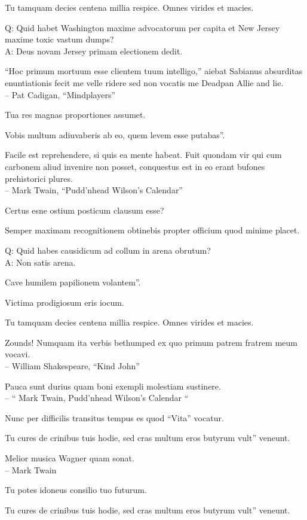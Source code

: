 \documentclass[titlepage,12pt]{memoir}
\begin{document}
Tu tamquam decies centena millia respice. Omnes virides et macies.

Q: Quid habet Washington maxime advocatorum per capita et
New Jersey maxime toxic vastum dumps?\\
A: Deus novam Jersey primam electionem dedit.

 “Hoc primum mortuum esse clientem tuum intelligo,” aiebat Sabianus
absurditas enuntiationis fecit me velle ridere sed non vocatis me
Deadpan Allie and lie.
\\-- Pat Cadigan, “Mindplayers”

Tua res magnas proportiones assumet.

Vobis multum adiuvaberis ab eo, quem levem esse putabas”.

Facile est reprehendere, si quis ea mente habeat. Fuit quondam vir
qui cum carbonem aliud invenire non posset, conquestus est
in eo erant bufones prehistorici plures.
\\-- Mark Twain, “Pudd’nhead Wilson’s Calendar”

 Certus esne ostium posticum clausum esse?

Semper maximam recognitionem obtinebis propter officium quod minime placet.

Q: Quid habes causidicum ad collum in arena obrutum?\\
A: Non satis arena.

Cave humilem papilionem volantem”.

Victima prodigiosum eris iocum.

Tu tamquam decies centena millia respice. Omnes virides et macies.

Zounds! Numquam ita verbis bethumped
ex quo primum patrem fratrem meum vocavi.
\\-- William Shakespeare, “Kind John”

 Pauca sunt durius quam boni exempli molestiam sustinere.
\\-- “ Mark Twain, Pudd’nhead Wilson’s Calendar “

Nunc per difficilis transitus tempus es quod “Vita” vocatur.

Tu cures de crinibus tuis hodie, sed cras multum eros butyrum vult”
veneunt.

Melior musica Wagner quam sonat.
\\-- Mark Twain

Tu potes idoneus consilio tuo futurum.

Tu cures de crinibus tuis hodie, sed cras multum eros butyrum vult”
veneunt.
\end{document}
